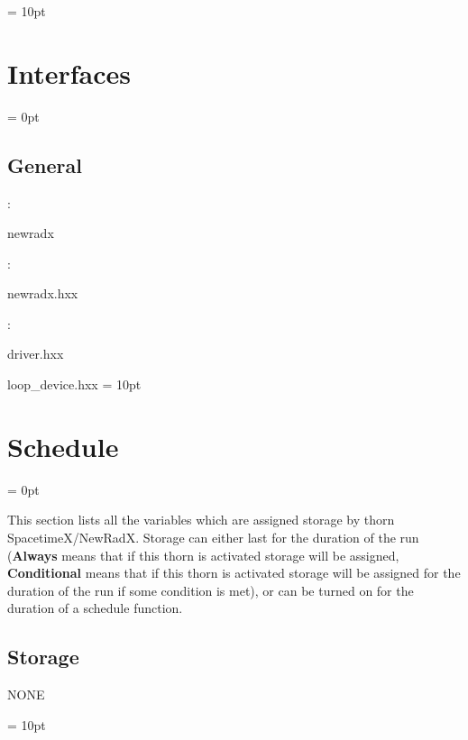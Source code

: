 \vspace{0.5cm}\parskip = 10pt 

\section{Interfaces} 


\parskip = 0pt

\vspace{3mm} \subsection*{General}

: 

newradx
\vspace{2mm}

\vspace{5mm}

: 



newradx.hxx
\vspace{2mm}

: 

driver.hxx

loop\_device.hxx
\vspace{2mm}\parskip = 10pt 

\section{Schedule} 


\parskip = 0pt


\noindent This section lists all the variables which are assigned storage by thorn SpacetimeX/NewRadX.  Storage can either last for the duration of the run ({\bf Always} means that if this thorn is activated storage will be assigned, {\bf Conditional} means that if this thorn is activated storage will be assigned for the duration of the run if some condition is met), or can be turned on for the duration of a schedule function.


\subsection*{Storage}NONE

\vspace{5mm}\parskip = 10pt 

